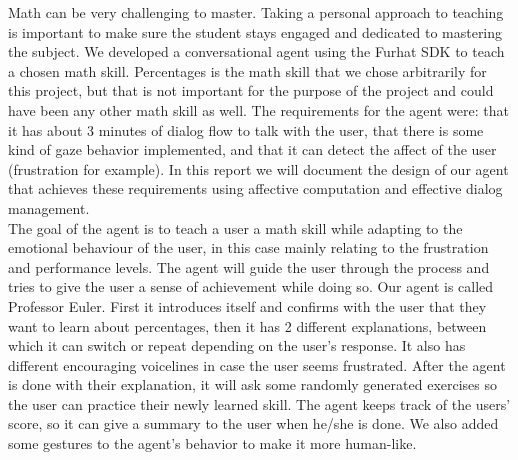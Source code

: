 Math can be very challenging to master. Taking a personal approach to teaching is important to make sure the student stays engaged and dedicated to mastering the subject. We developed a conversational agent using the Furhat SDK \cite{Furhat} to teach a chosen math skill. Percentages is the math skill that we chose arbitrarily for this project, but that is not important for the purpose of the project and could have been any other math skill as well. The requirements for the agent were: that it has about 3 minutes of dialog flow to talk with the user, that there is some kind of gaze behavior implemented, and that it can detect the affect of the user (frustration for example). In this report we will document the design of our agent that achieves these requirements using affective computation and effective dialog management.\\

\noindent The goal of the agent is to teach a user a math skill while adapting to the emotional behaviour of the user, in this case mainly relating to the frustration and performance levels. The agent will guide the user through the process and tries to give the user a sense of achievement while doing so. Our agent is called Professor Euler. First it introduces itself and confirms with the user that they want to learn about percentages, then it has 2 different explanations, between which it can switch or repeat depending on the user's response. It also has different encouraging voicelines in case the user seems frustrated. After the agent is done with their explanation, it will ask some randomly generated exercises so the user can practice their newly learned skill. The agent keeps track of the users' score, so it can give a summary to the user when he/she is done. We also added some gestures to the agent's behavior to make it more human-like.